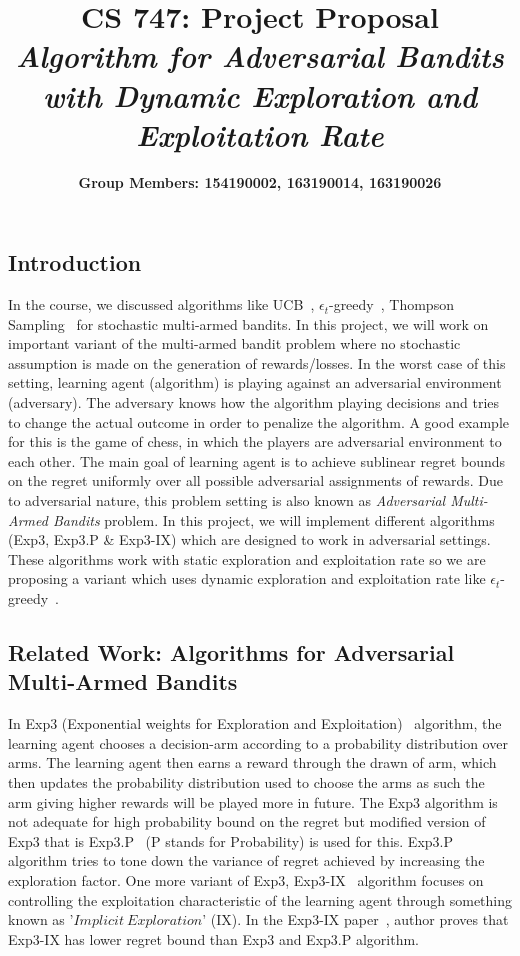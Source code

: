 \documentclass[a4paper, 11pt]{article}
\title{\textbf{CS 747: Project Proposal} \\
	\Large{\textbf{\textit{Algorithm for Adversarial Bandits with Dynamic Exploration and Exploitation Rate}}}}
\author{\bf Group  Members: 154190002, 163190014, 163190026}
\date{}
\begin{document}
	\maketitle
	
	\subsection*{Introduction}
	In the course, we discussed algorithms like UCB~\cite{auer2002finite}, $\epsilon_t$-greedy~\cite{auer2002finite}, Thompson Sampling~\cite{kaufmann2012thompson} for stochastic multi-armed bandits. 
	In this project, we will work on important variant of the multi-armed bandit problem where no stochastic assumption is made on the generation of rewards/losses. In the worst case of this setting, learning agent (algorithm) is playing against an adversarial environment (adversary). The adversary knows how the algorithm playing decisions and tries to change the actual outcome in order to penalize the algorithm. A good example for this is the game of chess, in which the players are adversarial environment to each other. The main goal of learning agent is to achieve sublinear regret bounds on the regret uniformly over all possible adversarial assignments of rewards. Due to adversarial nature, this problem setting is also known as {\it Adversarial Multi-Armed Bandits} problem. In this project, we will implement different algorithms (Exp3, Exp3.P \& Exp3-IX) which are designed to work in adversarial settings. These algorithms work with static exploration and exploitation rate so we are proposing a variant which uses dynamic exploration and exploitation rate like $\epsilon_t$-greedy~\cite{auer2002finite}.
	
	
	\subsection*{Related Work: Algorithms for Adversarial Multi-Armed Bandits}
	In Exp3 (Exponential weights for Exploration and Exploitation)~\cite{auer2002nonstochastic} algorithm, the learning agent chooses a decision-arm according to a probability distribution over arms. The learning agent then earns a reward through the drawn of arm, which then updates the probability distribution used to choose the arms as such the arm giving higher rewards will be played more in future. The Exp3 algorithm is not adequate for high probability bound on the regret but modified version of Exp3 that is Exp3.P~\cite{auer2002nonstochastic} (P stands for Probability) is used for this. Exp3.P algorithm tries to tone down the variance of regret achieved by increasing the exploration factor. One more variant of Exp3, Exp3-IX~\cite{neu2015explore} algorithm focuses on controlling the exploitation characteristic of the learning agent through something known as '$Implicit\ Exploration$'  (IX). In the Exp3-IX paper~\cite{neu2015explore}, author proves that Exp3-IX has lower regret bound than Exp3 and Exp3.P algorithm. 
	
\end{document}
